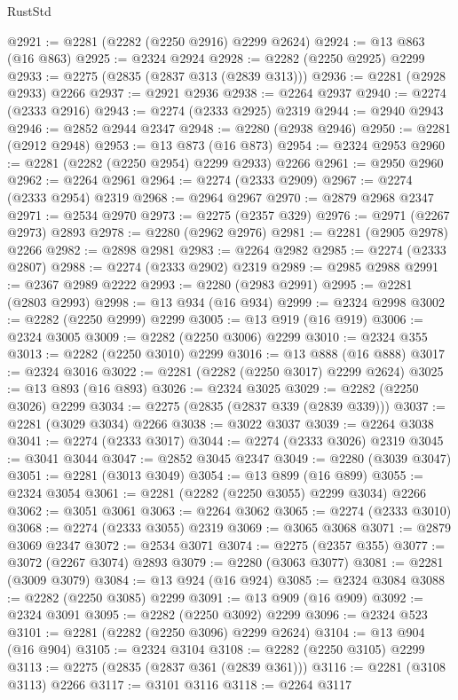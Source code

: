 \begin{lexlean}{RustStd}
\begin{coremodule}
@2921 := @2281 (@2282 (@2250 @2916) @2299 @2624)
@2924 := @13 @863 (@16 @863)
@2925 := @2324 @2924
@2928 := @2282 (@2250 @2925) @2299
@2933 := @2275 (@2835 (@2837 @313 (@2839 @313)))
@2936 := @2281 (@2928 @2933) @2266
@2937 := @2921 @2936
@2938 := @2264 @2937
@2940 := @2274 (@2333 @2916)
@2943 := @2274 (@2333 @2925) @2319
@2944 := @2940 @2943
@2946 := @2852 @2944 @2347
@2948 := @2280 (@2938 @2946)
@2950 := @2281 (@2912 @2948)
@2953 := @13 @873 (@16 @873)
@2954 := @2324 @2953
@2960 := @2281 (@2282 (@2250 @2954) @2299 @2933) @2266
@2961 := @2950 @2960
@2962 := @2264 @2961
@2964 := @2274 (@2333 @2909)
@2967 := @2274 (@2333 @2954) @2319
@2968 := @2964 @2967
@2970 := @2879 @2968 @2347
@2971 := @2534 @2970
@2973 := @2275 (@2357 @329)
@2976 := @2971 (@2267 @2973) @2893
@2978 := @2280 (@2962 @2976)
@2981 := @2281 (@2905 @2978) @2266
@2982 := @2898 @2981
@2983 := @2264 @2982
@2985 := @2274 (@2333 @2807)
@2988 := @2274 (@2333 @2902) @2319
@2989 := @2985 @2988
@2991 := @2367 @2989 @2222
@2993 := @2280 (@2983 @2991)
@2995 := @2281 (@2803 @2993)
@2998 := @13 @934 (@16 @934)
@2999 := @2324 @2998
@3002 := @2282 (@2250 @2999) @2299
@3005 := @13 @919 (@16 @919)
@3006 := @2324 @3005
@3009 := @2282 (@2250 @3006) @2299
@3010 := @2324 @355
@3013 := @2282 (@2250 @3010) @2299
@3016 := @13 @888 (@16 @888)
@3017 := @2324 @3016
@3022 := @2281 (@2282 (@2250 @3017) @2299 @2624)
@3025 := @13 @893 (@16 @893)
@3026 := @2324 @3025
@3029 := @2282 (@2250 @3026) @2299
@3034 := @2275 (@2835 (@2837 @339 (@2839 @339)))
@3037 := @2281 (@3029 @3034) @2266
@3038 := @3022 @3037
@3039 := @2264 @3038
@3041 := @2274 (@2333 @3017)
@3044 := @2274 (@2333 @3026) @2319
@3045 := @3041 @3044
@3047 := @2852 @3045 @2347
@3049 := @2280 (@3039 @3047)
@3051 := @2281 (@3013 @3049)
@3054 := @13 @899 (@16 @899)
@3055 := @2324 @3054
@3061 := @2281 (@2282 (@2250 @3055) @2299 @3034) @2266
@3062 := @3051 @3061
@3063 := @2264 @3062
@3065 := @2274 (@2333 @3010)
@3068 := @2274 (@2333 @3055) @2319
@3069 := @3065 @3068
@3071 := @2879 @3069 @2347
@3072 := @2534 @3071
@3074 := @2275 (@2357 @355)
@3077 := @3072 (@2267 @3074) @2893
@3079 := @2280 (@3063 @3077)
@3081 := @2281 (@3009 @3079)
@3084 := @13 @924 (@16 @924)
@3085 := @2324 @3084
@3088 := @2282 (@2250 @3085) @2299
@3091 := @13 @909 (@16 @909)
@3092 := @2324 @3091
@3095 := @2282 (@2250 @3092) @2299
@3096 := @2324 @523
@3101 := @2281 (@2282 (@2250 @3096) @2299 @2624)
@3104 := @13 @904 (@16 @904)
@3105 := @2324 @3104
@3108 := @2282 (@2250 @3105) @2299
@3113 := @2275 (@2835 (@2837 @361 (@2839 @361)))
@3116 := @2281 (@3108 @3113) @2266
@3117 := @3101 @3116
@3118 := @2264 @3117

\end{coremodule}
\end{lexlean}
